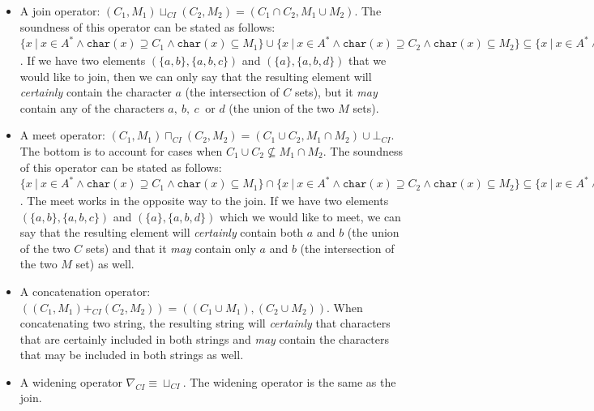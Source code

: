 \documentclass[10pt]{report}
\begin{document}
\begin{itemize}
	\item A join operator: $(C_{1}, M_{1}) \sqcup_{CI} (C_{2}, M_{2}) = (C_{1} \cap C_{2}, M_{1} \cup M_{2})$. The soundness of this operator can be stated as follows: \\ $ \lbrace x\ \vert\ x \in A^{*} \wedge \mathtt{char}(x) \supseteq C_{1} \wedge \mathtt{char}(x) \subseteq M_{1} \rbrace \cup \lbrace x\ \vert\ x \in A^{*} \wedge \mathtt{char}(x) \supseteq C_{2} \wedge \mathtt{char}(x) \subseteq M_{2} \rbrace \subseteq  \lbrace x\ \vert\ x \in A^{*} \wedge \mathtt{char}(x) \supseteq C_{1}\ \cap\ C_{2}\ \wedge\ \mathtt{char}(x) \subseteq M_{1} \cup M_{2} \rbrace \Longleftrightarrow \gamma_{CI}((C_{1}, M_{1})) \cup \gamma_{CI}((C_{2}, M_{2})) \subseteq \gamma_{CI}((C_{1}, M_{1}) \sqcup_{CI} (C_{2}, M_{2}))$. If we have two elements $ (\lbrace a, b \rbrace, \lbrace a, b, c \rbrace) $ and $ (\lbrace a \rbrace, \lbrace a, b, d \rbrace) $ that we would like to join, then we can only say that the resulting element will \textit{certainly} contain the character $ a $ (the intersection of $ C $ sets), but it \textit{may} contain any of the characters $ a,\ b,\ c\ $ or $ d $ (the union of the two $ M $ sets). 
	
	 
	\item A meet operator: $(C_{1}, M_{1}) \sqcap_{CI} (C_{2}, M_{2}) = (C_{1} \cup C_{2}, M_{1} \cap M_{2}) \cup \bot_{CI}$. The bottom is to account for cases when $C_{1} \cup C_{2} \not\subseteq M_{1} \cap M_{2}$. The soundness of this operator can be stated as follows: \\$ \lbrace x\ \vert\ x \in A^{*} \wedge \mathtt{char}(x) \supseteq C_{1} \wedge \mathtt{char}(x) \subseteq M_{1} \rbrace \cap \lbrace x\ \vert\ x \in A^{*} \wedge \mathtt{char}(x) \supseteq C_{2} \wedge \mathtt{char}(x) \subseteq M_{2} \rbrace \subseteq  \lbrace x\ \vert\ x \in A^{*} \wedge \mathtt{char}(x) \supseteq C_{1} \cup C_{2} \wedge \mathtt{char}(x) \subseteq M_{1} \cap M_{2} \rbrace \Longleftrightarrow \gamma_{CI}((C_{1}, M_{1})) \cap \gamma_{CI}((C_{2}, M_{2})) \subseteq \gamma_{CI}((C_{1}, M_{1}) \sqcap_{CI} (C_{2}, M_{2}))$. The meet works in the opposite way to the join. If we have two elements $ (\lbrace a, b \rbrace, \lbrace a, b, c \rbrace) $ and $ (\lbrace a \rbrace, \lbrace a, b, d \rbrace) $ which we would like to meet, we can say that the resulting element will \textit{certainly} contain both $ a $ and $ b $ (the union of the two $ C $ sets) and that it \textit{may} contain only $ a $ and $ b $ (the intersection of the two $ M $ set) as well.  
 	
	\item A concatenation operator: $ ((C_{1}, M_{1}) +_{CI} (C_{2}, M_{2})) = ((C_{1} \cup M_{1}),(C_{2} \cup M_{2}))$. When concatenating two string, the resulting string will \textit{certainly} that characters that are certainly included in both strings and \textit{may} contain the characters that may be included in both strings as well. 
	\item A widening operator $\nabla_{CI} \equiv \sqcup_{CI}.$ The widening operator is the same as the join. 
	
\end{itemize}
\end{document}
